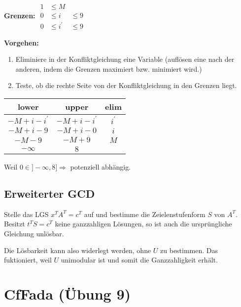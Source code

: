\documentclass[a4paper,10pt]{article}
\begin{document}
\textbf{Grenzen:}
$\begin{array}{lll}
   1 & \leq M & \\
   0 & \leq i & \leq 9 \\
   0 & \leq i^\prime & \leq 9
\end{array}$

\textbf{Vorgehen:}
\begin{enumerate}
\item Eliminiere in der Konfliktgleichung eine Variable (auflösen eine nach der anderen, indem die Grenzen maximiert bzw. minimiert wird.)
\item Teste, ob die rechte Seite von der Konfliktgleichung in den Grenzen liegt.
\end{enumerate}
\begin{center}
\begin{tabular}{c|c|c}
lower & upper & elim \\
\hline
\( -M + i - i^\prime \) & \( -M+i-i^\prime\) & \(i^\prime \) \\
\hline
\( -M+ i - 9 \) & \( -M + i -0 \) & \( i \) \\
\hline
\(-M -9 \) & \( -M +9 \) & \( M \) \\
\hline
\( -\infty \) & \(8\) & \\
\end{tabular}
\end{center}

Weil \( 0 \in ] - \infty, 8 ] \Rightarrow \) potenziell abhängig.
\subsection{Erweiterter GCD}

Stelle das LGS $x^TA^T=c^T$ auf und bestimme die Zeielenstufenform $S$ von $A^T$.
Besitzt $t^TS=c^T$ keine ganzzahligen Lösungen, so ist auch die ursprüngliche Gleichung unlösbar.

Die Lösbarkeit kann also widerlegt werden, ohne $U$ zu bestimmen. Das fuktioniert, weil $U$ unimodular ist und somit die Ganzzahligkeit erhält.

\section{CfFada (Übung 9)}
\end{document}
